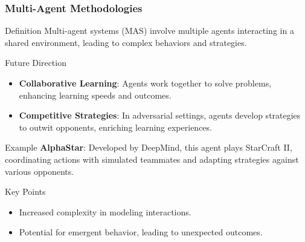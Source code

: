 \documentclass[aspectratio=169]{beamer}
\begin{document}
\begin{frame}[fragile]
    \frametitle{Multi-Agent Methodologies}
    \begin{block}{Definition}
        Multi-agent systems (MAS) involve multiple agents interacting in a shared environment, leading to complex behaviors and strategies.
    \end{block}
    
    \begin{block}{Future Direction}
        \begin{itemize}
            \item \textbf{Collaborative Learning}: Agents work together to solve problems, enhancing learning speeds and outcomes.
            \item \textbf{Competitive Strategies}: In adversarial settings, agents develop strategies to outwit opponents, enriching learning experiences.
        \end{itemize}
    \end{block}

    \begin{block}{Example}
        \textbf{AlphaStar}: Developed by DeepMind, this agent plays StarCraft II, coordinating actions with simulated teammates and adapting strategies against various opponents.
    \end{block}
    
    \begin{block}{Key Points}
        \begin{itemize}
            \item Increased complexity in modeling interactions.
            \item Potential for emergent behavior, leading to unexpected outcomes.
        \end{itemize}
    \end{block}
\end{frame}
\end{document}
